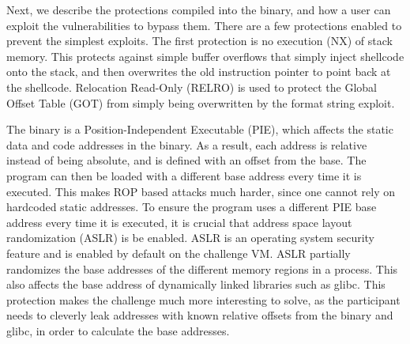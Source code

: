 Next, we describe the protections compiled into the binary, and how a user can exploit the vulnerabilities to bypass them. 
There are a few protections enabled to prevent the simplest exploits. The first protection is no execution (NX) of stack memory. This protects against simple buffer overflows that simply inject shellcode onto the stack, and then overwrites the old instruction pointer to point back at the shellcode. Relocation Read-Only (RELRO)\cite{relro} is used to protect the Global Offset Table (GOT)\cite{got} from simply being overwritten by the format string exploit.


The binary is a Position-Independent Executable (PIE)\cite{pie}, which affects the static data and code addresses in the binary. 
As a result, each address is relative instead of being absolute, and is defined with an offset from the base. The program can then be loaded with a different base address every time it is executed. 
This makes ROP based attacks much harder, since one cannot rely on hardcoded static addresses.
To ensure the program uses a different PIE base address every time it is executed, it is crucial that address space layout randomization (ASLR)\cite{aslr} is be enabled. ASLR is an operating system security feature and is enabled by default on the challenge VM. ASLR partially randomizes the base addresses of the different memory regions in a process. This also affects the base address of dynamically linked libraries such as glibc. This protection makes the challenge much more interesting to solve, as the participant needs to cleverly leak addresses with known relative offsets from the binary and glibc, in order to calculate the base addresses.

